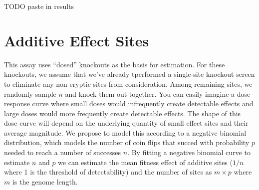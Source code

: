 TODO paste in results

\section{Additive Effect Sites}

This assay uses ``dosed'' knockouts as the basis for estimation.
For these knockouts, we assume that we've already tperformed a single-site knockout screen to eliminate any non-cryptic sites from consideration.
Among remaining sites, we randomly sample $n$ and knock them out together.
You can easily imagine a dose-response curve where small doses would infrequently create detectable effects and large doses would more frequently create detectable effects.
The shape of this dose curve will depend on the underlying quantity of small effect sites and their average magnitude.
We propose to model this according to a negative binomial distribution, which models the number of coin flips that succed with probability $p$ needed to reach a number of successes $n$.
By fitting a negative binomial curve to estimate $n$ and $p$ we can estimate the mean fitness effect of additive sites ($1/n$ where 1 is the threshold of detectability) and the number of sites as $m \times p$ where $m$ is the genome length.





